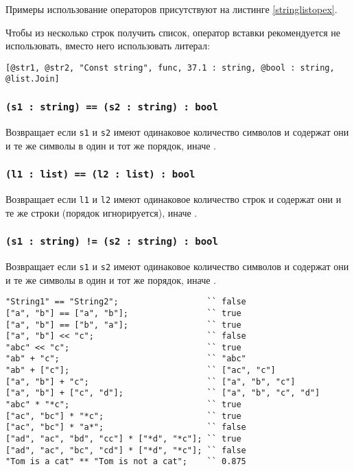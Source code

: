 Примеры использование операторов присутствуют на листинге \ref{stringlistopex}.

Чтобы из несколько строк получить список, оператор вставки рекомендуется не использовать, вместо него использовать литерал:
\begin{verbatim}
[@str1, @str2, "Const string", func, 37.1 : string, @bool : string, @list.Join]
\end{verbatim}

\subsubsection{\texttt{(s1 : string) == (s2 : string) : bool}}

Возвращает \true{} если \texttt{s1} и \texttt{s2} имеют одинаковое количество символов и содержат они и те же символы в один и тот же порядок, иначе \false{}.

\subsubsection{\texttt{(l1 : list) == (l2 : list) : bool}}

Возвращает \true{} если \texttt{l1} и \texttt{l2} имеют одинаковое количество строк и содержат они и те же строки (порядок игнорируется), иначе \false{}.

\subsubsection{\texttt{(s1 : string) != (s2 : string) : bool}}

Возвращает \false{} если \texttt{s1} и \texttt{s2} имеют одинаковое количество символов и содержат они и те же символы в один и тот же порядок, иначе \true{}.

\begin{sourcecode}
\label{stringlistopex}
\begin{verbatim}
"String1" == "String2";					 `` false
["a", "b"] == ["a", "b"];				 `` true
["a", "b"] == ["b", "a"];				 `` true
["a", "b"] << "c";						 `` false
"abc" << "c";							 `` true
"ab" + "c";								 `` "abc"
"ab" + ["c"];							 `` ["ac", "c"]
["a", "b"] + "c";						 `` ["a", "b", "c"]
["a", "b"] + ["c", "d"];				 `` ["a", "b", "c", "d"]
"abc" * "*c";							 `` true
["ac", "bc"] * "*c";					 `` true
["ac", "bc"] * "a*";					 `` false
["ad", "ac", "bd", "cc"] * ["*d", "*c"]; `` true
["ad", "ac", "bc", "cd"] * ["*d", "*c"]; `` false
"Tom is a cat" ** "Tom is not a cat";	 `` 0.875
\end{verbatim}
\end{sourcecode}


